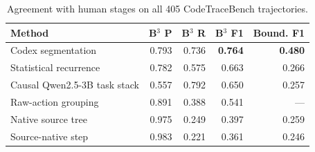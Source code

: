\documentclass[sigconf,nonacm]{acmart}
\begin{document}
\begin{table}[tb]
\centering\small
\setlength{\tabcolsep}{2.0pt}
\begin{tabular}{@{}lrrrr@{}}
\toprule
Method & B$^3$ P & B$^3$ R & B$^3$ F1 & Bound. F1 \\
\midrule
Codex segmentation & 0.793 & 0.736 & \textbf{0.764} & \textbf{0.480} \\
Statistical recurrence & 0.782 & 0.575 & 0.663 & 0.266 \\
Causal Qwen2.5-3B task stack & 0.557 & 0.792 & 0.650 & 0.257 \\
Raw-action grouping & 0.891 & 0.388 & 0.541 & --- \\
Native source tree & 0.975 & 0.249 & 0.397 & 0.259 \\
Source-native step & 0.983 & 0.221 & 0.361 & 0.246 \\
\bottomrule
\end{tabular}
\caption{Agreement with human stages on all 405 CodeTraceBench trajectories.}
\label{tab:rq3-codetrace}
\end{table}
\end{document}

